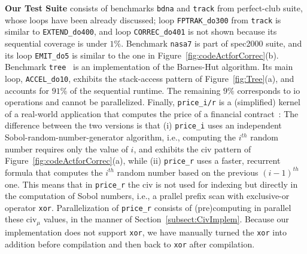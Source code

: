 \documentclass{sig-alternate}
\begin{document}
\enlargethispage{\baselineskip}
\vspace{1ex}

{\bf Our Test Suite} consists of benchmarks {\tt bdna} and {\tt track} 
from {\sc perfect-club} suite, whose loops have been already discussed;
loop {\tt FPTRAK\_do300} from {\tt track} is similar to {\tt EXTEND\_do400},
and loop {\tt CORREC\_do401} is not shown because 
its sequential coverage is under $1\%$. 
%
Benchmark {\tt nasa7} is part of {\sc spec2000} suite, and its loop {\tt EMIT\_do5}
is similar to the one in Figure~\ref{fig:codeActforCorrec}(b).
%
Benchmark {\tt tree}~\cite{Treecode} is an implementation of the Barnes-Hut algorithm.
Its main loop, {\tt ACCEL\_do10}, exhibits the stack-access pattern of Figure~\ref{fig:Tree}(a),
and accounts for $91\%$ of the sequential runtime. The remaining $9\%$ corresponds to {\sc io}
operations and cannot be parallelized.
%
Finally,  {\tt price\_i/r} is a (simplified) kernel of a real-world application that
computes the price of a financial contract~\cite{LexiFiPricing}:   The difference
between the two versions is that (i) {\tt price\_i} uses an independent Sobol-random-number-generator
algorithm, i.e., computing the $i^{th}$ random number requires only the value of $i$,
and exhibits the {\sc civ} pattern of Figure~\ref{fig:codeActforCorrec}(a), 
while (ii) {\tt price\_r} uses a faster, recurrent formula that computes the 
$i^{th}$ random number based on the previous $(i-1)^{th}$ one. 
This means that in {\tt price\_r} the {\sc civ} is not used for indexing
but directly in the computation of Sobol numbers, i.e., a prallel prefix 
scan with exclusive-or operator {\tt xor}. 
Parallelization of {\tt price\_r} consists of (pre)computing
in parallel these {\sc civ}$_\mu$ values, in the manner of 
Section~\ref{subsect:CivImplem}.  
%
Because our implementation does not support {\tt xor},
we have manually turned the {\tt xor} into addition before 
compilation and then back to {\tt xor} after compilation. 

\end{document}
